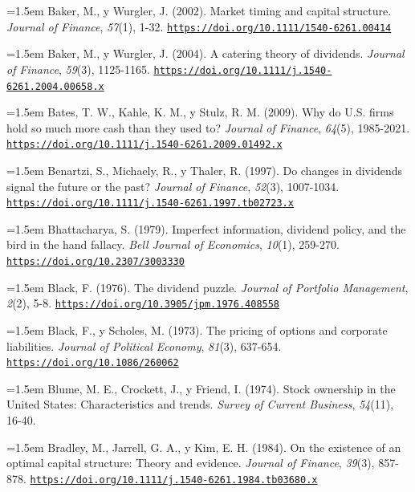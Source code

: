 \documentclass[10pt,a4paper]{article}
\begin{document}
\noindent\hangindent=1.5em Baker, M., y Wurgler, J. (2002). Market timing and capital structure. \textit{Journal of Finance}, \textit{57}(1), 1-32. \href{https://doi.org/10.1111/1540-6261.00414}{\nolinkurl{https://doi.org/10.1111/1540-6261.00414}}

\noindent\hangindent=1.5em Baker, M., y Wurgler, J. (2004). A catering theory of dividends. \textit{Journal of Finance}, \textit{59}(3), 1125-1165. \href{https://doi.org/10.1111/j.1540-6261.2004.00658.x}{\nolinkurl{https://doi.org/10.1111/j.1540-6261.2004.00658.x}}

\noindent\hangindent=1.5em Bates, T. W., Kahle, K. M., y Stulz, R. M. (2009). Why do U.S. firms hold so much more cash than they used to? \textit{Journal of Finance}, \textit{64}(5), 1985-2021. \href{https://doi.org/10.1111/j.1540-6261.2009.01492.x}{\nolinkurl{https://doi.org/10.1111/j.1540-6261.2009.01492.x}}

\noindent\hangindent=1.5em Benartzi, S., Michaely, R., y Thaler, R. (1997). Do changes in dividends signal the future or the past? \textit{Journal of Finance}, \textit{52}(3), 1007-1034. \href{https://doi.org/10.1111/j.1540-6261.1997.tb02723.x}{\nolinkurl{https://doi.org/10.1111/j.1540-6261.1997.tb02723.x}}

\noindent\hangindent=1.5em Bhattacharya, S. (1979). Imperfect information, dividend policy, and the bird in the hand fallacy. \textit{Bell Journal of Economics}, \textit{10}(1), 259-270. \href{https://doi.org/10.2307/3003330}{\nolinkurl{https://doi.org/10.2307/3003330}}

\noindent\hangindent=1.5em Black, F. (1976). The dividend puzzle. \textit{Journal of Portfolio Management}, \textit{2}(2), 5-8. \href{https://doi.org/10.3905/jpm.1976.408558}{\nolinkurl{https://doi.org/10.3905/jpm.1976.408558}}

\noindent\hangindent=1.5em Black, F., y Scholes, M. (1973). The pricing of options and corporate liabilities. \textit{Journal of Political Economy}, \textit{81}(3), 637-654. \href{https://doi.org/10.1086/260062}{\nolinkurl{https://doi.org/10.1086/260062}}

\noindent\hangindent=1.5em Blume, M. E., Crockett, J., y Friend, I. (1974). Stock ownership in the United States: Characteristics and trends. \textit{Survey of Current Business}, \textit{54}(11), 16-40.

\noindent\hangindent=1.5em Bradley, M., Jarrell, G. A., y Kim, E. H. (1984). On the existence of an optimal capital structure: Theory and evidence. \textit{Journal of Finance}, \textit{39}(3), 857-878. \href{https://doi.org/10.1111/j.1540-6261.1984.tb03680.x}{\nolinkurl{https://doi.org/10.1111/j.1540-6261.1984.tb03680.x}}
\end{document}
